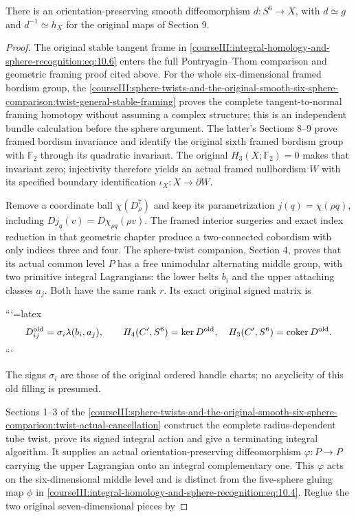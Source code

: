 \begin{theorem}
There is an orientation-preserving smooth diffeomorphism \(d:S^6\to X\), with \(d\simeq g\) and \(d^{-1}\simeq h_X\) for the original maps of Section 9.
\end{theorem}
\begin{proof}
The original stable tangent frame in \eqref{courseIII:integral-homology-and-sphere-recognition:eq:10.6} enters the full Pontryagin–Thom comparison and geometric framing proof cited above. For the whole six-dimensional framed bordism group, the \cref{courseIII:sphere-twists-and-the-original-smooth-six-sphere-comparison:twist-general-stable-framing} proves the complete tangent-to-normal framing homotopy without assuming a complex structure; this is an independent bundle calculation before the sphere argument. The latter's Sections 8–9 prove framed bordism invariance and identify the original sixth framed bordism group with \(\mathbb F_2\) through its quadratic invariant. The original \(H_3(X;\mathbb F_2)=0\) makes that invariant zero; injectivity therefore yields an actual framed nullbordism \(W\) with its specified boundary identification \(\iota_X:X\to\partial W\).

Remove a coordinate ball \(\chi(D^7_\rho)\) and keep its parametrization \(j(q)=\chi(\rho q)\), including \(Dj_q(v)=D\chi_{\rho q}(\rho v)\). The framed interior surgeries and exact index reduction in that geometric chapter produce a two-connected cobordism with only indices three and four. The sphere-twist companion, Section 4, proves that its actual common level \(P\) has a free unimodular alternating middle group, with two primitive integral Lagrangians: the lower belts \(b_i\) and the upper attaching classes \(a_j\). Both have the same rank \(r\). Its exact original signed matrix is


```{=latex}
\begin{equation}
D^{\rm old}_{ij}=\sigma_i\lambda(b_i,a_j),\qquad
 H_4(C',S^6)=\ker D^{\rm old},\quad
 H_3(C',S^6)=\operatorname{coker}D^{\rm old}.
 \label{courseIII:integral-homology-and-sphere-recognition:eq:10.7}
\end{equation}
```


The signs \(\sigma_i\) are those of the original ordered handle charts; no acyclicity of this old filling is presumed.

Sections 1–3 of the \cref{courseIII:sphere-twists-and-the-original-smooth-six-sphere-comparison:twist-actual-cancellation} construct the complete radius-dependent tube twist, prove its signed integral action and give a terminating integral algorithm. It supplies an actual orientation-preserving diffeomorphism \(\varphi:P\to P\) carrying the upper Lagrangian onto an integral complementary one. This \(\varphi\) acts on the six-dimensional middle level and is distinct from the five-sphere gluing map \(\phi\) in \eqref{courseIII:integral-homology-and-sphere-recognition:eq:10.4}. Reglue the two original seven-dimensional pieces by



\end{proof}
